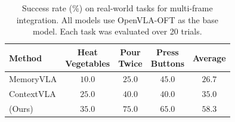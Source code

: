 \begin{table}[htbp]
\centering
\caption{Success rate (\%) on real-world tasks for multi-frame integration. All models use OpenVLA-OFT as the base model. Each task was evaluated over 20 trials.}
\label{tab:real_mem}
\begin{tabular}{l|ccc|c}
\toprule
Method
& \makecell{Heat\\Vegetables}
& \makecell{Pour\\Twice}
& \makecell{Press\\Buttons}
& Average \\
\midrule
MemoryVLA
& $10.0$
& $25.0$
& $45.0$
& $26.7$ \\
ContextVLA
& $25.0$
& $40.0$
& $40.0$
& $35.0$ \\
\dysta{} (Ours)
& $\mathbf{35.0}$
& $\mathbf{75.0}$
& $\mathbf{65.0}$
& $\mathbf{58.3}$ \\
\bottomrule
\end{tabular}
\end{table}